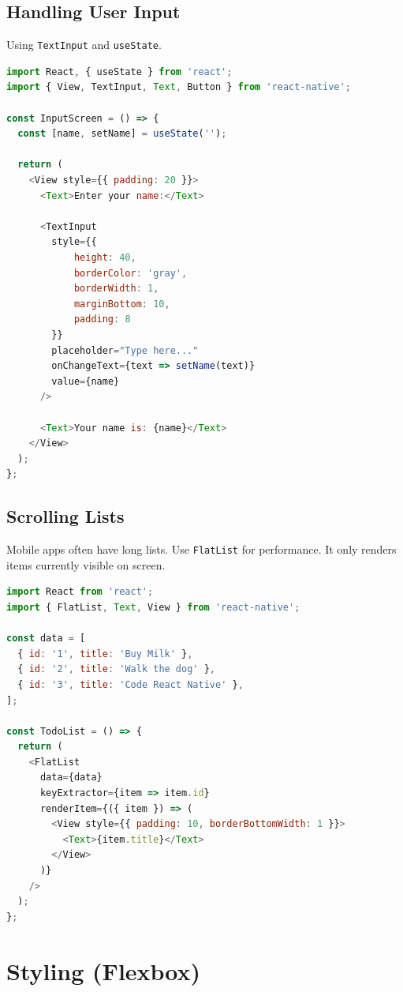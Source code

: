 \documentclass[11pt,a4paper,oneside]{book}
\begin{document}
\section{Handling User Input}

Using \texttt{TextInput} and \texttt{useState}.

\begin{lstlisting}[language=JavaScript, caption=Input Example]
import React, { useState } from 'react';
import { View, TextInput, Text, Button } from 'react-native';

const InputScreen = () => {
  const [name, setName] = useState('');

  return (
    <View style={{ padding: 20 }}>
      <Text>Enter your name:</Text>
      
      <TextInput
        style={{
            height: 40,
            borderColor: 'gray',
            borderWidth: 1,
            marginBottom: 10,
            padding: 8
        }}
        placeholder="Type here..."
        onChangeText={text => setName(text)}
        value={name}
      />
      
      <Text>Your name is: {name}</Text>
    </View>
  );
};
\end{lstlisting}

\section{Scrolling Lists}

Mobile apps often have long lists. Use \texttt{FlatList} for performance. It only renders items currently visible on screen.

\begin{lstlisting}[language=JavaScript, caption=FlatList Example]
import React from 'react';
import { FlatList, Text, View } from 'react-native';

const data = [
  { id: '1', title: 'Buy Milk' },
  { id: '2', title: 'Walk the dog' },
  { id: '3', title: 'Code React Native' },
];

const TodoList = () => {
  return (
    <FlatList
      data={data}
      keyExtractor={item => item.id}
      renderItem={({ item }) => (
        <View style={{ padding: 10, borderBottomWidth: 1 }}>
          <Text>{item.title}</Text>
        </View>
      )}
    />
  );
};
\end{lstlisting}

\chapter{Styling (Flexbox)}
\end{document}
